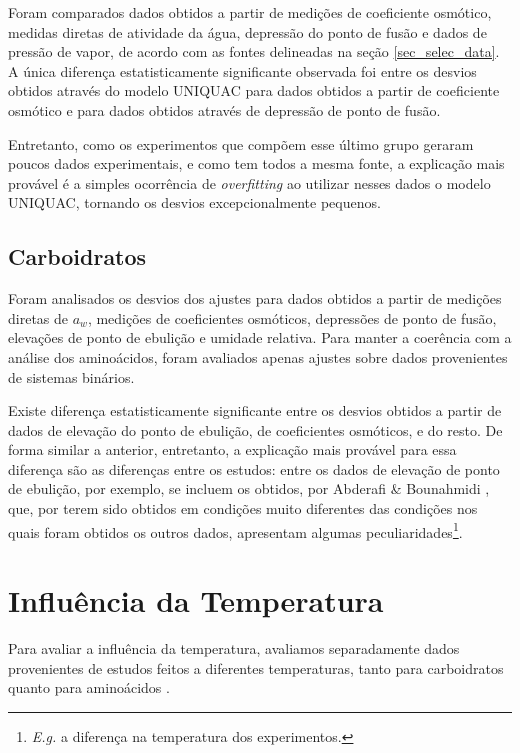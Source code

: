 \documentclass[
	12pt,				%
	openright,
	twoside,
	a4paper,			%
	brazil,			%
	french,				%
	spanish,			%
	english				%
	]{abntex2}
\begin{document}
Foram comparados dados obtidos a partir de medições de coeficiente osmótico,
medidas diretas de atividade da água, depressão do ponto de fusão e dados de
pressão de vapor, de acordo com as fontes delineadas na seção \ref{sec_selec_data}.
A única diferença estatisticamente significante observada foi entre os desvios
obtidos através do modelo UNIQUAC para dados obtidos a partir de coeficiente
osmótico e para dados obtidos através de depressão de ponto de fusão.

Entretanto, como os experimentos que compõem esse último grupo geraram poucos
dados experimentais, e como tem todos a mesma fonte, a explicação mais provável
é a simples ocorrência de \textit{overfitting} ao utilizar nesses dados o modelo
UNIQUAC, tornando os desvios excepcionalmente pequenos.

\subsection{Carboidratos}

Foram analisados os desvios dos ajustes para dados obtidos a partir de medições
diretas de $a_w$, medições de coeficientes osmóticos, depressões de ponto de fusão,
elevações de ponto de ebulição e umidade relativa. Para manter a coerência com a
análise dos aminoácidos, foram avaliados apenas ajustes sobre dados provenientes de
sistemas binários.

Existe diferença estatisticamente significante entre os desvios obtidos a partir
de dados de elevação do ponto de ebulição, de coeficientes osmóticos, e do resto.
De forma similar a anterior, entretanto, a explicação mais provável para essa
diferença são as diferenças entre os estudos: entre os dados de elevação de ponto
de ebulição, por exemplo, se incluem os obtidos, por Abderafi \& Bounahmidi
\cite{abderafi1994}, que, por terem sido obtidos em condições muito diferentes
das condições nos quais foram obtidos os outros dados, apresentam algumas
peculiaridades\footnote{%
	\textit{E.g.} a diferença na temperatura dos experimentos.
}.


\section{Influência da Temperatura}

Para avaliar a influência da temperatura, avaliamos separadamente dados
provenientes de estudos feitos a diferentes temperaturas, tanto para carboidratos
\cite{velezmoro2000} quanto para aminoácidos \cite{romero2006,tsurko2007}.
\end{document}
